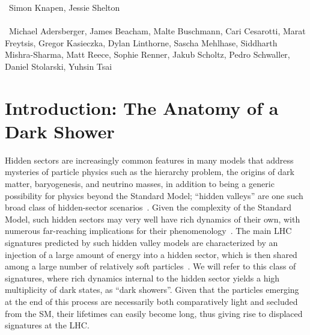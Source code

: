 ~Simon Knapen, Jessie Shelton \\
\text{ \; }\\
~Michael Adersberger, James Beacham, Malte Buschmann, Cari Cesarotti, Marat Freytsis, Gregor Kasieczka, Dylan Linthorne,  Sascha Mehlhase,  Siddharth Mishra-Sharma, Matt Reece, Sophie Renner, Jakub Scholtz, Pedro Schwaller, Daniel Stolarski, Yuhsin Tsai 
\text{ \; }\\

\section{Introduction: The Anatomy of a Dark Shower}
\label{sec:darkshowerintro}

Hidden sectors are increasingly common features in many models that address mysteries of particle physics such as the hierarchy problem, the origins of dark matter, baryogenesis, and neutrino masses, in addition to being a generic possibility for physics beyond the Standard Model; ``hidden valleys'' are one such broad class of hidden-sector scenarios~\cite{Strassler:2006im,Han:2007ae}. Given the complexity of the Standard Model, such hidden sectors may very well have rich dynamics of their own, with numerous far-reaching implications for their phenomenology~\cite{Strassler:2006ri,Strassler:2006qa,Strassler:2008bv,Strassler:2008fv,Juknevich:2009ji}. The main LHC signatures predicted by such hidden valley models are characterized by an injection of a large amount of energy into a hidden sector, which is then shared among a large number of relatively soft particles~\cite{Strassler:2008bv}. We will refer to this class of signatures, where rich dynamics internal to the hidden sector yields a high multiplicity of dark states, as ``dark showers''. Given that the particles emerging at the end of this process are necessarily both comparatively light and secluded from the SM, their lifetimes can easily become long, thus giving rise to displaced signatures at the LHC.

